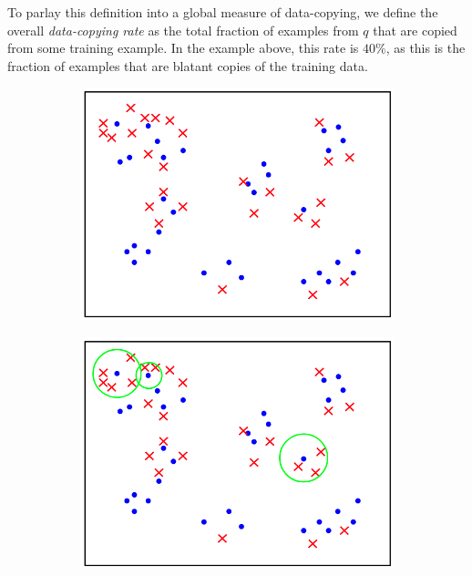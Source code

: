 To parlay this definition into a global measure of data-copying, we define the overall \textit{data-copying rate} as the total fraction of examples from $q$ that are copied from some training example. In the example above, this rate is $40\%$, as this is the fraction of examples that are blatant copies of the training data.

\begin{figure}[ht]
    \begin{subfigure}{0.31\textwidth}\includegraphics[width=\linewidth]{default.png}
    \end{subfigure}\hspace*{\fill}
	\begin{subfigure}{0.31\textwidth}\includegraphics[width=\linewidth]{add_regions.png}

\end{subfigure}
\end{figure}
